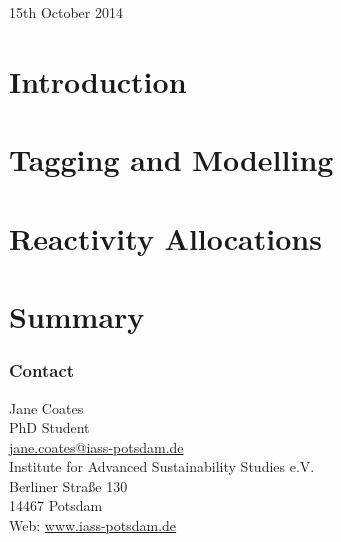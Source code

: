 \documentclass[center]{beamer}
\begin{document}


\begin{frame} %
    \vspace{3cm}
    {\Large \textcolor{\highlightcolor}{\textbf{\slidesettitle}}}\\ 
    \vspace{1cm}
    {\Large \textcolor{GreyIASS}{\textbf{\authorname}}} \\
    \vspace{.5cm}
    {\large \textcolor{GreyIASS}{15th October 2014}} 
\end{frame}



\centering
\section{Introduction}


\section{Tagging and Modelling}
 

\section{Reactivity Allocations}


\section{Summary}


\begin{frame} %
    \frametitle{Contact}

    \begin{flushleft}
        \textcolor{BlueIASS} {
            Jane Coates\\
            PhD Student\\
            \href{mailto:jane.coates@iass-potsdam.de}{jane.coates@iass-potsdam.de} \\ \vspace{5mm}
            Institute for Advanced Sustainability Studies e.V. \\
            Berliner Stra{\ss}e 130 \\
            14467 Potsdam \\
            Web: \url{www.iass-potsdam.de}
        }
    \end{flushleft}

\end{frame}

\appendix
 
\end{document}
